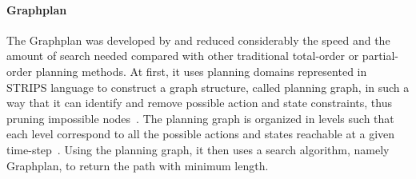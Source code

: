 \documentclass[12pt, a4paper]{article}
\begin{document}
\paragraph{Graphplan} The Graphplan was developed by \citet{Blum1997} and reduced considerably the speed and the amount of search needed compared with other traditional total-order or partial-order planning methods. At first, it uses planning domains represented in STRIPS language to construct a graph structure, called planning graph, in such a way that it can identify and remove possible action and state constraints, thus pruning impossible nodes~\citep{Blum1997}. The planning graph is organized in levels such that each level correspond to all the possible actions and states reachable at a given time-step~\citep{Russell2009}. Using the planning graph, it then uses a search algorithm, namely Graphplan, to return the path with minimum length.



\end{document}
